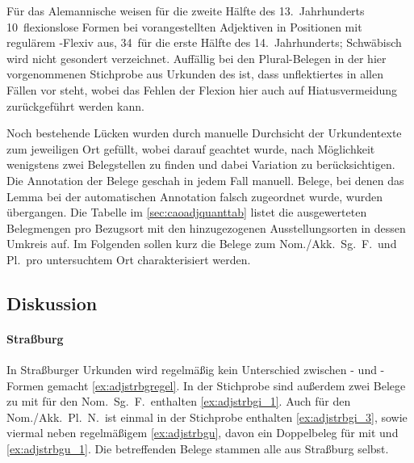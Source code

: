 Für das Alemannische weisen \citet[271, Abb.\ A~47]{ksw2} für
die zweite Hälfte des 13.~Jahrhunderts 10\pct\ flexionslose Formen bei
vorangestellten Adjektiven in Positionen mit regulärem -Flexiv aus,
34\pct\ für die erste Hälfte des 14.~Jahrhunderts; Schwäbisch wird nicht
gesondert verzeichnet. Auffällig bei den Plural-Belegen in der hier
vorgenommenen Stichprobe aus Urkunden des \CAO{} ist, dass
unflektiertes
  in allen Fällen vor
  steht, wobei das Fehlen der Flexion hier auch auf
Hiatusvermeidung zurückgeführt werden kann.

Noch bestehende Lücken wurden durch manuelle Durchsicht der Urkundentexte zum
jeweiligen Ort gefüllt, wobei darauf geachtet wurde, nach Möglichkeit
wenigstens zwei Belegstellen zu finden und dabei Variation zu berücksichtigen.
Die Annotation der Belege geschah in jedem Fall manuell. Belege, bei denen das
Lemma bei der automatischen Annotation falsch zugeordnet wurde, wurden
übergangen. Die Tabelle im \cref{sec:caoadjquanttab} listet die ausgewerteten
Belegmengen pro Bezugsort mit den hinzugezogenen Ausstellungs\-orten in dessen
Umkreis auf. Im Folgenden sollen kurz die Belege zum Nom./Akk.\ Sg.\ F.\ und
Pl.\ pro untersuchtem Ort charakterisiert werden.

\subsection{Diskussion}
\label{subsec:cao_adjflex_disc}

\paragraph{Straßburg}
\label{par:adjstrassburg}
In Straßburger Urkunden wird regelmäßig kein Unterschied zwischen - und
-Formen gemacht \cref{ex:adjstrbgregel}. In der Stichprobe sind
außerdem zwei Belege zu
  mit  für den Nom.\ Sg.\ F.\
enthalten \cref{ex:adjstrbgi_1}. Auch für den Nom./Akk.\ Pl.\ N.\ ist einmal
\lit{-i} in der Stichprobe enthalten \cref{ex:adjstrbgi_3}, sowie viermal
\lit{-u/-û} neben regelmäßigem  \cref{ex:adjstrbgu}, davon ein
Doppelbeleg für \norm{kristenlich} \wdef{christlich} mit \lit{-u} und
\lit{-e} \cref{ex:adjstrbgu_1}. Die betreffenden Belege stammen alle aus
Straßburg selbst.

